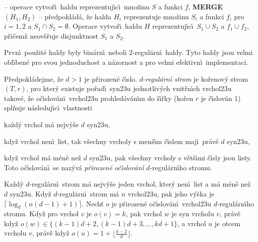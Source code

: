 \documentclass[a4paper,12pt]{article}
\begin{document}
 -- operace vytvo\v r\'\i\ haldu 
reprezentuj\'\i c\'\i\ mno\v zinu $S$ a funkci $f$,\newline 
{\bf MERGE$(H_1,H_2)$} -- p\v redpokl\'ad\'a, \v ze halda $H_i$ reprezentuje 
mno\v zinu $S_i$ a funkci $f_i$ pro $i=1,2$ a $S_1\cap S_2=\emptyset$. Operace 
vytvo\v r\'\i\ haldu $H$ reprezentuj\'\i c\'\i\ $S_1\cup S_2$ a $
f_1\cup f_2$, 
p\v ri\v cem\v z neov\v e\v ruje disjunktnost $S_1$ a $S_2$.
\newpage

\centerline{}
\bigskip

\flushpar Prvn\'\i\ pou\v zit\'e haldy byly bin\'arn\'\i\ neboli $
2$-regul\'arn\'\i\ haldy. 
Tyto haldy jsou velmi obl\'\i ben\'e pro svou jednoduchost a 
n\'azornost a pro velmi efektivn\'\i\ implementaci.
\medskip

\flushpar P\v redpokl\'adejme, \v ze $d>1$ je p\v rirozen\'e \v c\'\i slo. 
$d$-\emph{regul\'arn\'\i} \emph{strom} je ko\v renov\'y strom 
$(T,r)$, pro kter\'y existuje po\v rad\'\i\ syn\accent23u 
jednotliv\'ych vnit\v rn\'\i ch vrchol\accent23u takov\'e, \v ze 
o\v c\'\i slov\'an\'\i\ vrchol\accent23u pro\-hle\-d\'a\-v\'an\'\i m do \v s\'\i\v rky 
(ko\v ren $r$ je \v c\'\i slov\'an $1$) spl\v nuje n\'asleduj\'\i c\'\i\ vlastnosti
\roster
\item
ka\v zd\'y vrchol m\'a nejv\'y\v se $d$ syn\accent23u,
\item
kdy\v z vrchol nen\'\i\ list, tak v\v sechny vrcholy s men\v s\'\i m 
\v c\'\i slem maj\'\i\ pr\'av\v e $d$ syn\accent23u,
\item
kdy\v z vrchol m\'a m\'en\v e ne\v z $d$ syn\accent23u, pak v\v sechny 
vrcholy s v\v et\v s\'\i mi \v c\'\i sly jsou listy.
\endroster
Toto o\v c\'\i slov\'an\'\i\ se naz\'yv\'a \emph{p\v rirozen\'e} 
\emph{o\v c\'\i slov\'an\'\i} $d$-regul\'arn\'\i ho stromu. 
\medskip

Ka\v zd\'y $d$-regul\'arn\'\i\ strom m\'a nejv\'y\v se jeden 
vrchol, kter\'y nen\'\i\ list a m\'a m\'en\v e ne\v z $d$ syn\accent23u. Kdy\v z 
$d$-regul\'arn\'\i\ strom m\'a $n$ vrchol\accent23u, pak jeho 
v\'y\v ska je $\lceil\log_d(n(d-1)+1)\rceil$. Nech\v t $o$ je p\v rirozen\'e o\v c\'\i slov\'an\'\i\ 
vrchol\accent23u $d$-regul\'arn\'\i ho stromu. Kdy\v z pro vrchol 
$v$ je $o(v)=k$, pak vrchol $w$ je syn vrcholu $v$, pr\'av\v e 
kdy\v z $o(w)\in \{(k-1)d+2,(k-1)d+3,\dots,kd+1\}$, a vrchol $u$ je 
otcem vrcholu $v$, pr\'av\v e kdy\v z $o(u)=1+\lfloor\frac {k-2}d
\rfloor$. 
\endproclaim
\end{document}
